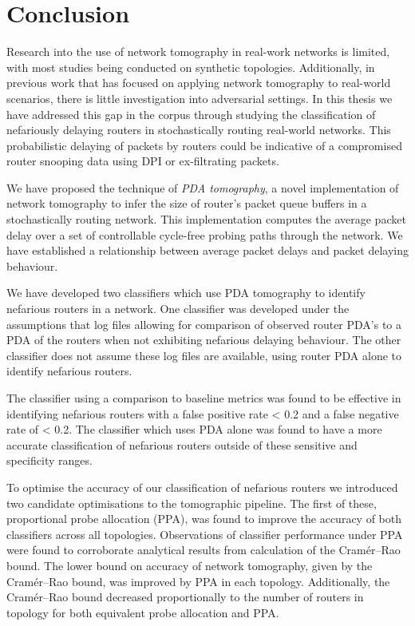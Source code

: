 \chapter{Conclusion}
\label{cha:conc}
Research into the use of network tomography in real-work networks is limited, with most studies being conducted on synthetic topologies. Additionally, in previous work that has focused on applying network tomography to real-world scenarios, there is little investigation into adversarial settings. In this thesis we have addressed this gap in the corpus through studying the classification of nefariously delaying routers in stochastically routing real-world networks. This probabilistic delaying of packets by routers could be indicative of a compromised router snooping data using DPI or ex-filtrating packets.\par
We have proposed the technique of \textit{PDA tomography}, a novel implementation of network tomography to infer the size of router's packet queue buffers in a stochastically routing network. This implementation computes the average packet delay over a set of controllable cycle-free probing paths through the network. We have established a relationship between average packet delays and packet delaying behaviour.\par
We have developed two classifiers which use PDA tomography to identify nefarious routers in a network. One classifier was developed under the assumptions that log files allowing for comparison of observed router PDA's to a PDA of the routers when not exhibiting nefarious delaying behaviour. The other classifier does not assume these log files are available, using router PDA alone to identify nefarious routers.\par
The classifier using a comparison to baseline metrics was found to be effective in identifying nefarious routers with a false positive rate < 0.2 and a false negative rate of < 0.2. The classifier which uses PDA alone was found to have a more accurate classification of nefarious routers outside of these sensitive and specificity ranges.\par
To optimise the accuracy of our classification of nefarious routers we introduced two candidate optimisations to the tomographic pipeline. The first of these, proportional probe allocation (PPA), was found to improve the accuracy of both classifiers across all topologies. Observations of classifier performance under PPA were found to corroborate analytical results from calculation of the Cramér–Rao bound. The lower bound on accuracy of network tomography, given by the Cramér–Rao bound, was improved by PPA in each topology. Additionally, the Cramér–Rao bound decreased proportionally to the number of routers in topology for both equivalent probe allocation and PPA.\par
